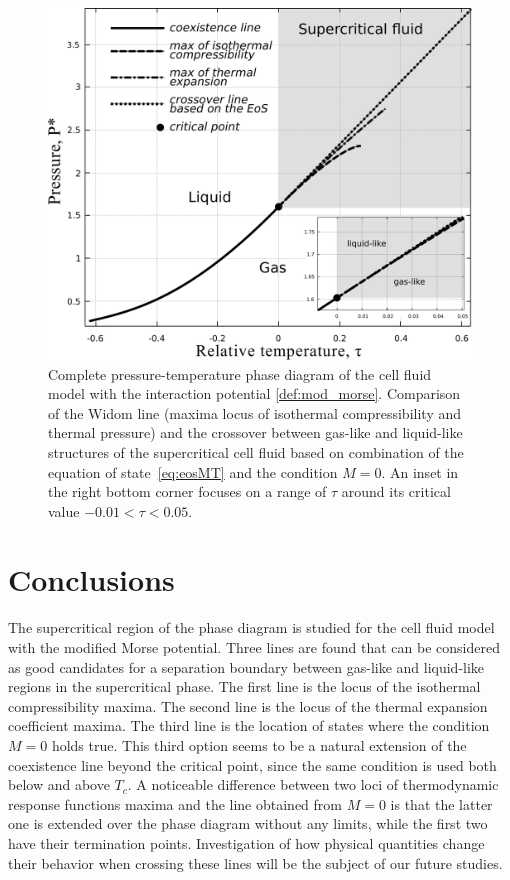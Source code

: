 \begin{figure}[h!]
	\centering \includegraphics[width=\column]{f4b.pdf}
	\vskip-3mm\caption{Complete pressure-temperature phase diagram of the cell fluid model with the interaction potential \eqref{def:mod_morse}. Comparison of the Widom line (maxima locus of isothermal compressibility and thermal pressure) and the crossover between gas-like and liquid-like structures of the supercritical cell fluid based on combination of the equation of state~\eqref{eq:eosMT} and the condition $M = 0$. An inset in the right bottom corner focuses on a range of $\tau$ around its critical value $-0.01 < \tau < 0.05$.	}\label{fig4}
\end{figure}

\section{Conclusions}
The supercritical region of the phase diagram is studied for the cell fluid model with the modified Morse potential. Three lines are found that can be considered as good candidates for a separation boundary between gas-like and liquid-like regions in the supercritical phase. The first line is the locus of the isothermal compressibility maxima. The second line is the locus of the thermal expansion coefficient maxima. The third line is the location of states where the condition $M=0$ holds true. This third option seems to be a natural extension of the coexistence line beyond the critical point, since the same condition is used both below and above $T_c$. A noticeable difference between two loci of thermodynamic response functions maxima and the line obtained from $M=0$ is that the latter one is extended over the phase diagram without any limits, while the first two have their termination points. Investigation of how physical quantities change their behavior when crossing these lines will be the subject of our future studies.


